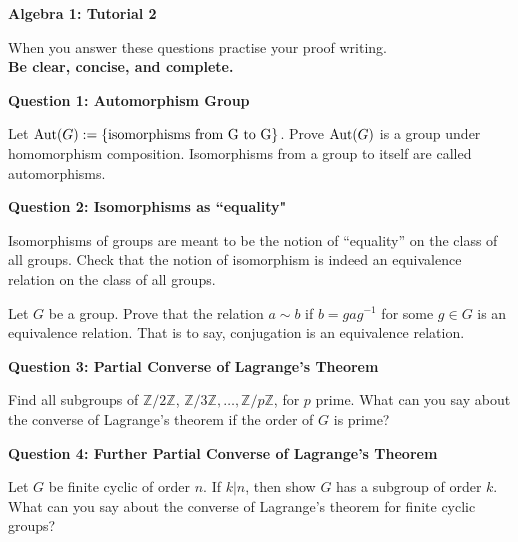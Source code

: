 \documentclass[11pt,twoside, a4paper]{report}
\theoremstyle{plain}
\theoremstyle{definition}
\newcommand{\Aut}{\textnormal{Aut}}%
\begin{document}
\begin{center}
 \noindent\makebox[\linewidth]{\rule{14cm}{1.5pt}} 
{\bf Algebra 1: Tutorial 2 }
 \noindent\makebox[\linewidth]{\rule{14cm}{1.5pt}}  
 \noindent\makebox[\linewidth]{\rule{14cm}{3pt}}
\end{center}

\noindent When you answer these questions practise your proof writing.\\
  {\bf Be clear, concise, and complete.}
  
  


  
\begin{center}
{\bf Question 1: Automorphism Group}
\end{center}

Let $\Aut(G):=\{\textnormal{isomorphisms from G to G}\}$. Prove $\Aut(G)$ is a group under homomorphism composition. Isomorphisms from a group to itself are called automorphisms.


  
\begin{center}
{\bf Question 2: Isomorphisms as ``equality" }
\end{center}

Isomorphisms of groups are meant to be the notion of ``equality'' on the class of all groups. Check that the notion of isomorphism is indeed an equivalence relation on the class of all groups.

Let $G$ be a group. Prove that the relation $a \sim b$ if $b=gag^{-1}$ for some $g \in G$ is an equivalence relation. That is to say, conjugation is an equivalence relation.

  
\begin{center}
{\bf Question 3: Partial Converse of Lagrange's Theorem}
\end{center}

Find all subgroups of $\mathbb{Z}/2\mathbb{Z}$, $\mathbb{Z}/3\mathbb{Z}, \dots , \mathbb{Z}/p\mathbb{Z}$, for $p$ prime. What can you say about the converse of Lagrange's theorem if the order of $G$ is prime?

  
\begin{center}
{\bf Question 4: Further Partial Converse of Lagrange's Theorem}
\end{center}

Let $G$ be finite cyclic of order $n$. If $k|n$, then show $G$ has a subgroup of order $k$. What can you say about the converse of Lagrange's theorem for finite cyclic groups?
\end{document}
